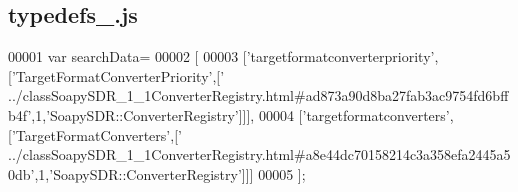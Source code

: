 \subsection{typedefs\+\_.\+js}
\label{typedefs__8_8js_source}

\begin{DoxyCode}
00001 var searchData=
00002 [
00003   [\textcolor{stringliteral}{'targetformatconverterpriority'},[\textcolor{stringliteral}{'TargetFormatConverterPriority'},[\textcolor{stringliteral}{'
      ../classSoapySDR\_1\_1ConverterRegistry.html#ad873a90d8ba27fab3ac9754fd6bffb4f'},1,\textcolor{stringliteral}{'SoapySDR::ConverterRegistry'}]]],
00004   [\textcolor{stringliteral}{'targetformatconverters'},[\textcolor{stringliteral}{'TargetFormatConverters'},[\textcolor{stringliteral}{'
      ../classSoapySDR\_1\_1ConverterRegistry.html#a8e44dc70158214c3a358efa2445a50db'},1,\textcolor{stringliteral}{'SoapySDR::ConverterRegistry'}]]]
00005 ];
\end{DoxyCode}

